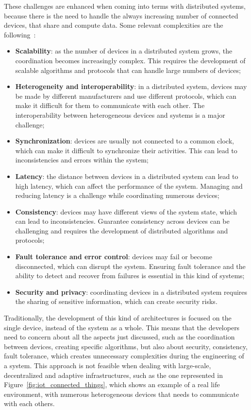 These challenges are enhanced when coming into terms with distributed systems, because there is the need to handle the always increasing number of connected devices, that share and compute data.\newline
Some relevant complexities are the following~\cite{distributed_systems_challenges}:
\begin{itemize}
    \item \textbf{Scalability}: as the number of devices in a distributed system grows, the coordination becomes increasingly complex. This requires the development of scalable algorithms and protocols that can handle large numbers of devices;
    \item \textbf{Heterogeneity and interoperability}: in a distributed system, devices may be made by different manufacturers and use different protocols, which can make it difficult for them to communicate with each other. The interoperability between heterogeneous devices and systems is a major challenge;
    \item \textbf{Synchronization}: devices are usually not connected to a common clock, which can make it difficult to synchronize their activities. This can lead to inconsistencies and errors within the system;
    \item \textbf{Latency}: the distance between devices in a distributed system can lead to high latency, which can affect the performance of the system. Managing and reducing latency is a challenge while coordinating numerous devices;
    \item \textbf{Consistency}: devices may have different views of the system state, which can lead to inconsistencies. Guarantee consistency across devices can be challenging and requires the development of distributed algorithms and protocols;
    \item \textbf{Fault tolerance and error control}: devices may fail or become disconnected, which can disrupt the system. Ensuring fault tolerance and the ability to detect and recover from failures is essential in this kind of systems;
    \item \textbf{Security and privacy}: coordinating devices in a distributed system requires the sharing of sensitive information, which can create security risks.
\end{itemize}

Traditionally, the development of this kind of architectures is focused on the single device, instead of the system as a whole. This means that the developers need to concern about all the aspects just discussed, such as the coordination between devices, creating specific algorithms, but also about security, consistency, fault tolerance, which creates unnecessary complexities during the engineering of a system.\newline
This approach is not feasible when dealing with large-scale, decentralized and adaptive infrastructures, such as the one represented in Figure~\ref{fig:iot_connected_things}, which shows an example of a real life environment, with numerous heterogeneous devices that needs to communicate with each others.


